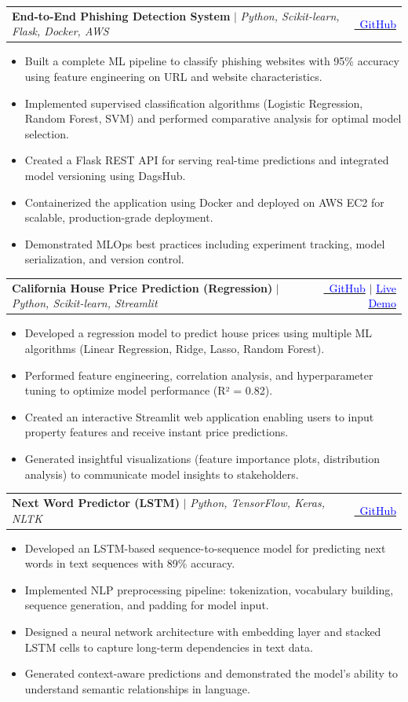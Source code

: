 \documentclass[a4paper,11pt]{article}
\makeatletter
\newcommand{\resumeItem}[1]{\item\small{{#1 \vspace{-2pt}}}}
\newcommand{\resumeProjectHeading}[2]{
    \item
    \begin{tabular*}{0.97\textwidth}{l@{\extracolsep{\fill}}r}
      \small#1 & #2 \\
    \end{tabular*}\vspace{-7pt}
}
\newcommand{\resumeItemListStart}{\begin{itemize}}
\newcommand{\resumeItemListEnd}{\end{itemize}\vspace{-5pt}}
\makeatother
\begin{document}
\resumeProjectHeading
  {\textbf{End-to-End Phishing Detection System} $|$ \emph{Python, Scikit-learn, Flask, Docker, AWS}}
  {
    \href{https://github.com/atulkanttiwari/End-to-End-Phishing-Detection-System}{\textcolor{blue}{\faGithub\ GitHub}}
  }
\resumeItemListStart
  \resumeItem{Built a complete ML pipeline to classify phishing websites with 95\% accuracy using feature engineering on URL and website characteristics.}
  \resumeItem{Implemented supervised classification algorithms (Logistic Regression, Random Forest, SVM) and performed comparative analysis for optimal model selection.}
  \resumeItem{Created a Flask REST API for serving real-time predictions and integrated model versioning using DagsHub.}
  \resumeItem{Containerized the application using Docker and deployed on AWS EC2 for scalable, production-grade deployment.}
  \resumeItem{Demonstrated MLOps best practices including experiment tracking, model serialization, and version control.}
\resumeItemListEnd

\resumeProjectHeading
  {\textbf{California House Price Prediction (Regression)} $|$ \emph{Python, Scikit-learn, Streamlit}}
  {
    \href{https://github.com/atulkanttiwari/California-House-Price-Predictor}{\textcolor{blue}{\faGithub\ GitHub}} $|$
    \href{https://california-house-predictor.streamlit.app/}{\textcolor{blue}{Live Demo}}
  }
\resumeItemListStart
  \resumeItem{Developed a regression model to predict house prices using multiple ML algorithms (Linear Regression, Ridge, Lasso, Random Forest).}
  \resumeItem{Performed feature engineering, correlation analysis, and hyperparameter tuning to optimize model performance (R² = 0.82).}
  \resumeItem{Created an interactive Streamlit web application enabling users to input property features and receive instant price predictions.}
  \resumeItem{Generated insightful visualizations (feature importance plots, distribution analysis) to communicate model insights to stakeholders.}
\resumeItemListEnd

\resumeProjectHeading
  {\textbf{Next Word Predictor (LSTM)} $|$ \emph{Python, TensorFlow, Keras, NLTK}}
  {
    \href{https://github.com/atulkanttiwari/Next_Word_Predictor_UsingLSTM}{\textcolor{blue}{\faGithub\ GitHub}}
  }
\resumeItemListStart
  \resumeItem{Developed an LSTM-based sequence-to-sequence model for predicting next words in text sequences with 89\% accuracy.}
  \resumeItem{Implemented NLP preprocessing pipeline: tokenization, vocabulary building, sequence generation, and padding for model input.}
  \resumeItem{Designed a neural network architecture with embedding layer and stacked LSTM cells to capture long-term dependencies in text data.}
  \resumeItem{Generated context-aware predictions and demonstrated the model's ability to understand semantic relationships in language.}
\resumeItemListEnd
\end{document}
